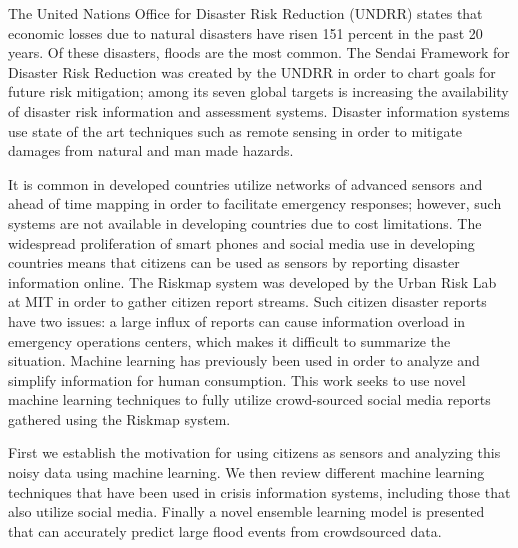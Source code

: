 
% 
% 
%


The United Nations Office for Disaster Risk Reduction (UNDRR) states that economic losses
due to natural disasters have risen 151 percent in the past 20 years. Of these
disasters, floods are the most common. The Sendai Framework for Disaster Risk Reduction
was created by the UNDRR in order to chart goals for future risk mitigation; among its
seven global targets is increasing the availability of disaster risk information
and assessment systems. Disaster information systems use state of the art techniques such as
remote sensing in order to mitigate damages from natural and man made hazards.

It is common in developed countries utilize networks of advanced sensors and
ahead of time mapping in order to facilitate emergency responses;
however, such systems are not available in developing countries due to cost limitations.
The widespread proliferation of smart phones and social media use in
developing countries means that citizens can be used as sensors by reporting
disaster information online. The Riskmap system was developed by the
Urban Risk Lab at MIT in order to gather citizen report streams. Such citizen
disaster reports have two issues:  a large influx of reports can cause
information overload in emergency operations centers, which makes it difficult to
summarize the situation. Machine learning has previously been used in order to
analyze and simplify information for human consumption. This work seeks to use
novel machine learning techniques to fully utilize crowd-sourced social media reports gathered
using the Riskmap system.

    First we establish the motivation for using citizens as sensors and
analyzing this noisy data using machine learning. We then review different
machine learning techniques that have been used in crisis information systems,
including those that also utilize social media.
Finally a novel ensemble learning model is presented that can accurately predict
large flood events from crowdsourced
data.
